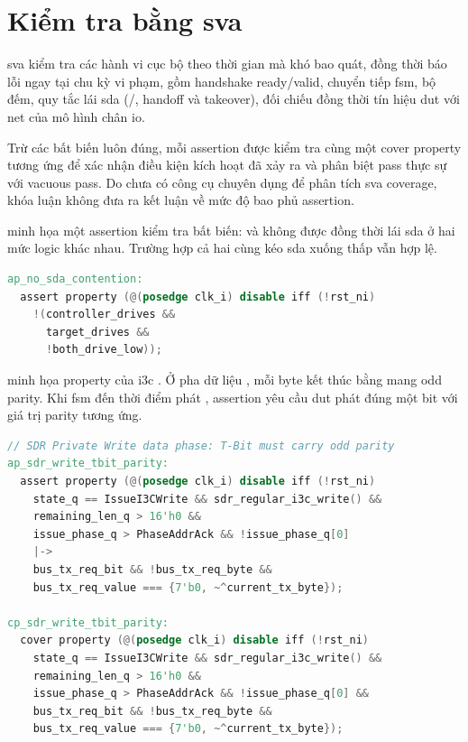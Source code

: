 \section{Kiểm tra bằng \texorpdfstring{\gls{sva}}{SVA}}
\label{sec:ver-sva}

\Gls{sva} kiểm tra các hành vi cục bộ theo thời gian mà \Scoreboard{} khó bao quát, đồng
thời báo lỗi ngay tại chu kỳ vi phạm, gồm handshake ready/valid, chuyển tiếp \gls{fsm}, bộ đếm,
quy tắc lái \gls{sda} (\OpenDrain{}/\PushPull{}, handoff và takeover), đối
chiếu đồng thời tín hiệu \gls{dut} với net của mô hình chân \gls{io}.

Trừ các bất biến luôn đúng, mỗi assertion được kiểm tra cùng một cover property tương ứng
để xác nhận điều kiện kích hoạt đã xảy ra và phân biệt pass thực sự với vacuous pass. Do chưa
có công cụ chuyên dụng để phân tích \gls{sva} coverage, khóa luận không đưa ra kết luận về
mức độ bao phủ assertion.

 minh họa một assertion kiểm tra bất biến: \Controller{} và
\Target{} không được đồng thời lái \gls{sda} ở hai mức logic khác nhau. Trường hợp cả hai
cùng kéo \gls{sda} xuống thấp vẫn hợp lệ.

\begin{lstlisting}[language=Verilog,caption={\acrshort{sva} kiểm tra bất biến không xung đột khi \Controller{} và \Target{} lái \acrshort{sda}.},label={lst:ver-sva-contention}]
ap_no_sda_contention:
  assert property (@(posedge clk_i) disable iff (!rst_ni)
    !(controller_drives &&
      target_drives &&
      !both_drive_low));
\end{lstlisting}

 minh họa property \TBit{} của \gls{i3c} \PrivateWrite{}. Ở pha dữ liệu \PushPull{}, mỗi byte kết thúc bằng \TBit{}
mang odd parity. Khi \gls{fsm} đến thời điểm phát \TBit{}, assertion yêu cầu \gls{dut} phát đúng một bit
với giá trị parity tương ứng.

\begin{lstlisting}[language=Verilog,caption={\acrshort{sva} kiểm tra T-Bit odd parity của \acrshort{i3c} \PrivateWrite{}.},label={lst:ver-sva-tbit}]
// SDR Private Write data phase: T-Bit must carry odd parity
ap_sdr_write_tbit_parity:
  assert property (@(posedge clk_i) disable iff (!rst_ni)
    state_q == IssueI3CWrite && sdr_regular_i3c_write() &&
    remaining_len_q > 16'h0 &&
    issue_phase_q > PhaseAddrAck && !issue_phase_q[0]
    |->
    bus_tx_req_bit && !bus_tx_req_byte &&
    bus_tx_req_value === {7'b0, ~^current_tx_byte});

cp_sdr_write_tbit_parity:
  cover property (@(posedge clk_i) disable iff (!rst_ni)
    state_q == IssueI3CWrite && sdr_regular_i3c_write() &&
    remaining_len_q > 16'h0 &&
    issue_phase_q > PhaseAddrAck && !issue_phase_q[0] &&
    bus_tx_req_bit && !bus_tx_req_byte &&
    bus_tx_req_value === {7'b0, ~^current_tx_byte});
\end{lstlisting}

